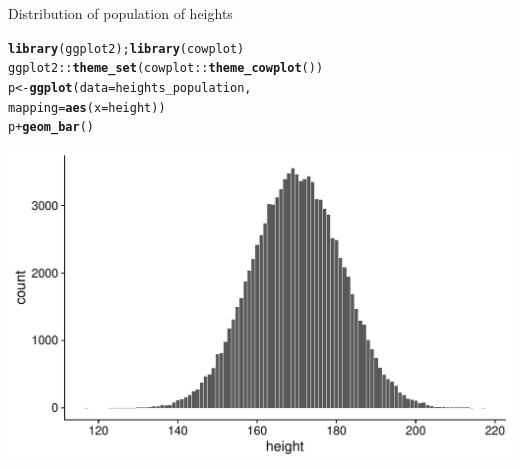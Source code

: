 \documentclass[10pt,handout]{beamer}\usepackage[]{graphicx}\usepackage[]{color}
\makeatletter
\def\maxwidth{ %
  \ifdim\Gin@nat@width>\linewidth
    \linewidth
  \else
    \Gin@nat@width
  \fi
}
\newcommand{\hlopt}[1]{\textcolor[rgb]{0,0,0}{#1}}%
\newcommand{\hlstd}[1]{\textcolor[rgb]{0.345,0.345,0.345}{#1}}%
\newcommand{\hlkwb}[1]{\textcolor[rgb]{0.69,0.353,0.396}{#1}}%
\newcommand{\hlkwc}[1]{\textcolor[rgb]{0.333,0.667,0.333}{#1}}%
\newcommand{\hlkwd}[1]{\textcolor[rgb]{0.737,0.353,0.396}{\textbf{#1}}}%
\newenvironment{kframe}{%
 \def\at@end@of@kframe{}%
 \ifinner\ifhmode%
  \def\at@end@of@kframe{\end{minipage}}%
  \begin{minipage}{\columnwidth}%
 \fi\fi%
 \def\FrameCommand##1{\hskip\@totalleftmargin \hskip-\fboxsep
 \colorbox{shadecolor}{##1}\hskip-\fboxsep
     \hskip-\linewidth \hskip-\@totalleftmargin \hskip\columnwidth}%
 \MakeFramed {\advance\hsize-\width
   \@totalleftmargin\z@ \linewidth\hsize
   \@setminipage}}%
 {\par\unskip\endMakeFramed%
 \at@end@of@kframe}
\newenvironment{knitrout}{}{} %
\makeatother
\begin{document}
\begin{frame}[fragile]{Distribution of population of heights}
	
\begin{knitrout}\scriptsize
{}\color{fgcolor}\begin{kframe}
\begin{alltt}
\hlkwd{library}\hlstd{(ggplot2);} \hlkwd{library}\hlstd{(cowplot)}
\hlstd{ggplot2}\hlopt{::}\hlkwd{theme_set}\hlstd{(cowplot}\hlopt{::}\hlkwd{theme_cowplot}\hlstd{())}
\hlstd{p} \hlkwb{<-} \hlkwd{ggplot}\hlstd{(}\hlkwc{data} \hlstd{= heights_population,}
             \hlkwc{mapping} \hlstd{=} \hlkwd{aes}\hlstd{(}\hlkwc{x} \hlstd{= height))}
\hlstd{p} \hlopt{+} \hlkwd{geom_bar}\hlstd{()}
\end{alltt}
\end{kframe}

{\centering \includegraphics[width=\maxwidth]{figure/unnamed-chunk-4-1} 

}


\end{knitrout}
	
\end{frame}
\end{document}

